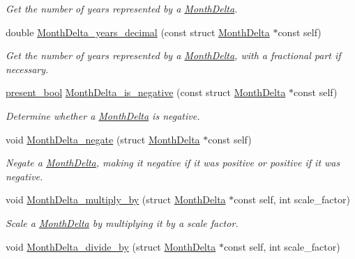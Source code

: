 \begin{DoxyCompactItemize}
\begin{DoxyCompactList}\small\item\em \-Get the number of years represented by a \hyperlink{structMonthDelta}{\-Month\-Delta}. \end{DoxyCompactList}\item 
double \hyperlink{month-delta_8h_a9215cb412f007649e357ba8cd9e171b9}{\-Month\-Delta\-\_\-years\-\_\-decimal} (const struct \hyperlink{structMonthDelta}{\-Month\-Delta} $\ast$const self)
\begin{DoxyCompactList}\small\item\em \-Get the number of years represented by a \hyperlink{structMonthDelta}{\-Month\-Delta}, with a fractional part if necessary. \end{DoxyCompactList}\item 
\hyperlink{types_8h_a1c24e2cdd988b886e889080ded176ae0}{present\-\_\-bool} \hyperlink{month-delta_8h_ada77ded958313a9162d1a7337b0374c7}{\-Month\-Delta\-\_\-is\-\_\-negative} (const struct \hyperlink{structMonthDelta}{\-Month\-Delta} $\ast$const self)
\begin{DoxyCompactList}\small\item\em \-Determine whether a \hyperlink{structMonthDelta}{\-Month\-Delta} is negative. \end{DoxyCompactList}\item 
void \hyperlink{month-delta_8h_a4d77c910d4ec5841e5e3f59d63490078}{\-Month\-Delta\-\_\-negate} (struct \hyperlink{structMonthDelta}{\-Month\-Delta} $\ast$const self)
\begin{DoxyCompactList}\small\item\em \-Negate a \hyperlink{structMonthDelta}{\-Month\-Delta}, making it negative if it was positive or positive if it was negative. \end{DoxyCompactList}\item 
void \hyperlink{month-delta_8h_a24e21fbf270d561b1dccf2ab9e083ba0}{\-Month\-Delta\-\_\-multiply\-\_\-by} (struct \hyperlink{structMonthDelta}{\-Month\-Delta} $\ast$const self, int scale\-\_\-factor)
\begin{DoxyCompactList}\small\item\em \-Scale a \hyperlink{structMonthDelta}{\-Month\-Delta} by multiplying it by a scale factor. \end{DoxyCompactList}\item 
void \hyperlink{month-delta_8h_ad7d99e42e53f6f55ef885d754f433500}{\-Month\-Delta\-\_\-divide\-\_\-by} (struct \hyperlink{structMonthDelta}{\-Month\-Delta} $\ast$const self, int scale\-\_\-factor)

\end{DoxyCompactItemize}
